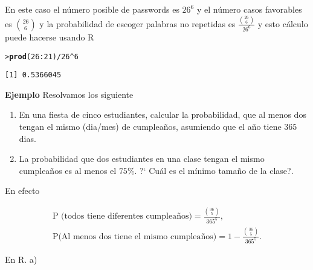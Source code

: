 \documentclass{article}\usepackage[]{graphicx}\usepackage[]{color}
\makeatletter
\newcommand{\hlnum}[1]{\textcolor[rgb]{0.686,0.059,0.569}{#1}}%
\newcommand{\hlopt}[1]{\textcolor[rgb]{0,0,0}{#1}}%
\newcommand{\hlstd}[1]{\textcolor[rgb]{0.345,0.345,0.345}{#1}}%
\newcommand{\hlkwd}[1]{\textcolor[rgb]{0.737,0.353,0.396}{\textbf{#1}}}%
\newenvironment{kframe}{%
 \def\at@end@of@kframe{}%
 \ifinner\ifhmode%
  \def\at@end@of@kframe{\end{minipage}}%
  \begin{minipage}{\columnwidth}%
 \fi\fi%
 \def\FrameCommand##1{\hskip\@totalleftmargin \hskip-\fboxsep
 \colorbox{shadecolor}{##1}\hskip-\fboxsep
     \hskip-\linewidth \hskip-\@totalleftmargin \hskip\columnwidth}%
 \MakeFramed {\advance\hsize-\width
   \@totalleftmargin\z@ \linewidth\hsize
   \@setminipage}}%
 {\par\unskip\endMakeFramed%
 \at@end@of@kframe}
\newenvironment{knitrout}{}{} %
\makeatother
\begin{document}
 \vspace{0.3cm}
 
 En este caso el n\'umero posible de passwords es $26^6$ y el n\'umero casos favorables es $\binom{26}{6}$ y la \mbox{probabilidad} de escoger palabras no repetidas es $\frac{\binom{26}{6}}{26^6}$ y esto c\'alculo puede hacerse usando R
 
 \vspace{0.3cm}
 
  
\begin{knitrout}
\color{fgcolor}\begin{kframe}
\begin{alltt}
\hlstd{> }\hlkwd{prod}\hlstd{(}\hlnum{26}\hlopt{:}\hlnum{21}\hlstd{)}\hlopt{/}\hlnum{26}\hlopt{^}\hlnum{6}
\end{alltt}
\begin{verbatim}
[1] 0.5366045
\end{verbatim}
\end{kframe}
\end{knitrout}
 
 
\vspace{0.5cm}

\textbf{Ejemplo} Resolvamos los siguiente 
\begin{enumerate}
\item En una fiesta de cinco estudiantes, calcular la probabilidad, que al menos dos tengan el mismo (dia/mes) de cumplea\~nos, asumiendo que el a\~no tiene $365$ dias.
\item La probabilidad que dos estudiantes en una clase tengan el mismo cumplea\~nos es al menos el $75\%$. ?` Cu\'al es el m\'inimo tama\~no de la clase?. 
\end{enumerate}

 \vspace{0.3cm}
 
 
 En efecto 
 
 \begin{align*}
 \mbox{P (todos tiene diferentes cumplea\~nos)} = \frac{\binom{36}{5}}{365^{5}}, \\
 \mbox{P(Al menos dos tiene el mismo cumplea\~nos)}= 1 - \frac{\binom{36}{5}}{365^{5}}.
 \end{align*}
 
 En R.  a)
 
\end{document}
